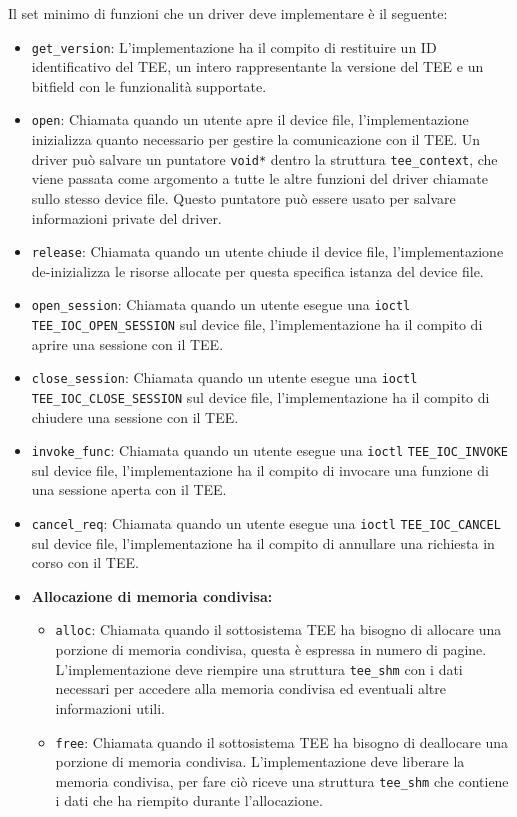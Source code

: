\documentclass[12pt,italian]{report}
\begin{document}
Il set minimo di funzioni che un driver deve implementare è il seguente:
\begin{itemize}
    \item \texttt{get\_version}: L'implementazione ha il compito di restituire
        un ID identificativo del TEE, un intero rappresentante la versione
        del TEE e un bitfield con le funzionalità supportate.
    \item \texttt{open}: Chiamata quando un utente apre il device file,
        l'implementazione inizializza quanto necessario per gestire la
        comunicazione con il TEE.
        Un driver può salvare un puntatore \texttt{void*} dentro la struttura
        \texttt{tee\_context}, che viene passata come argomento a tutte le
        altre funzioni del driver chiamate sullo stesso device file.
        Questo puntatore può essere usato per salvare informazioni private
        del driver.
    \item \texttt{release}: Chiamata quando un utente chiude il device file,
        l'implementazione de-inizializza le risorse allocate per questa
        specifica istanza del device file.
    \item \texttt{open\_session}: Chiamata quando un utente esegue una
        \texttt{ioctl} \texttt{TEE\_IOC\_OPEN\_SESSION} sul device file,
        l'implementazione ha il compito di aprire una sessione con il TEE.
    \item \texttt{close\_session}: Chiamata quando un utente esegue una
        \texttt{ioctl} \texttt{TEE\_IOC\_CLOSE\_SESSION} sul device file,
        l'implementazione ha il compito di chiudere una sessione con il TEE.
    \item \texttt{invoke\_func}: Chiamata quando un utente esegue una
        \texttt{ioctl} \texttt{TEE\_IOC\_INVOKE} sul device file,
        l'implementazione ha il compito di invocare una funzione di una
        sessione aperta con il TEE.
    \item \texttt{cancel\_req}: Chiamata quando un utente esegue una
        \texttt{ioctl} \texttt{TEE\_IOC\_CANCEL} sul device file,
        l'implementazione ha il compito di annullare una richiesta in
        corso con il TEE.
    \item \textbf{Allocazione di memoria condivisa: }
    \begin{itemize}
        \item \texttt{alloc}: Chiamata quando il sottosistema TEE ha
            bisogno di allocare una porzione di memoria condivisa,
            questa è espressa in numero di pagine.
            L'implementazione deve riempire una struttura \texttt{tee\_shm}
            con i dati necessari per accedere alla memoria condivisa ed
            eventuali altre informazioni utili.
        \item \texttt{free}: Chiamata quando il sottosistema TEE ha
            bisogno di deallocare una porzione di memoria condivisa.
            L'implementazione deve liberare la memoria condivisa, per
            fare ciò riceve una struttura \texttt{tee\_shm} che contiene
            i dati che ha riempito durante l'allocazione.
    \end{itemize}
\end{itemize}
\end{document}
